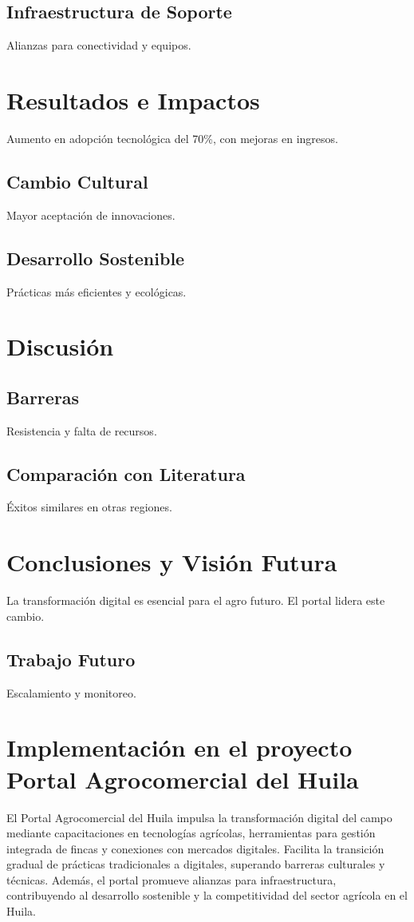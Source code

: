 \subsection{Infraestructura de Soporte}
Alianzas para conectividad y equipos.

\section{Resultados e Impactos}

Aumento en adopción tecnológica del 70\%, con mejoras en ingresos.

\subsection{Cambio Cultural}
Mayor aceptación de innovaciones.

\subsection{Desarrollo Sostenible}
Prácticas más eficientes y ecológicas.

\section{Discusión}

\subsection{Barreras}
Resistencia y falta de recursos.

\subsection{Comparación con Literatura}
Éxitos similares en otras regiones.

\section{Conclusiones y Visión Futura}

La transformación digital es esencial para el agro futuro. El portal lidera este cambio.

\subsection{Trabajo Futuro}
Escalamiento y monitoreo.

\section{Implementación en el proyecto Portal Agrocomercial del Huila}

El Portal Agrocomercial del Huila impulsa la transformación digital del campo mediante capacitaciones en tecnologías agrícolas, herramientas para gestión integrada de fincas y conexiones con mercados digitales. Facilita la transición gradual de prácticas tradicionales a digitales, superando barreras culturales y técnicas. Además, el portal promueve alianzas para infraestructura, contribuyendo al desarrollo sostenible y la competitividad del sector agrícola en el Huila.
